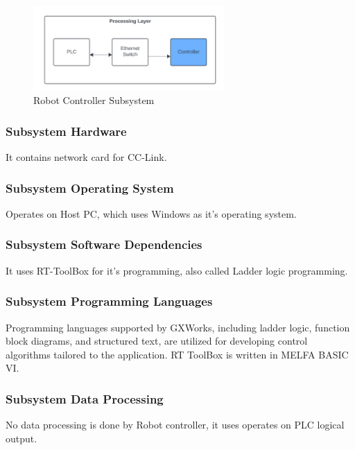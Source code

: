 \begin{figure}[h!]
	\centering
 	\includegraphics[width=0.65\textwidth]{images/Controller_Processing.png}
 \caption{Robot Controller Subsystem}
\end{figure}

\subsubsection{Subsystem Hardware}
It contains network card for CC-Link.

\subsubsection{Subsystem Operating System}
Operates on Host PC, which uses Windows as it's operating system. 

\subsubsection{Subsystem Software Dependencies}
It uses RT-ToolBox for it's programming, also called Ladder logic programming. 

\subsubsection{Subsystem Programming Languages}
Programming languages supported by GXWorks, including ladder logic, function block diagrams, and structured text, are utilized for developing control algorithms tailored to the application. RT ToolBox is written in MELFA BASIC VI.


\subsubsection{Subsystem Data Processing}
No data processing is done by Robot controller, it uses operates on PLC logical output. 
